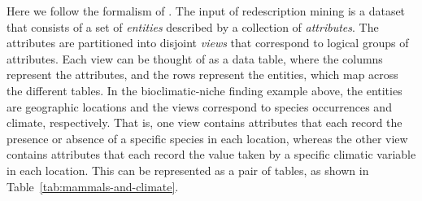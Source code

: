 \documentclass[12pt,a4paper]{article}
\begin{document}
Here we follow the formalism of \cite{Galbrun-Methods}.
The input of redescription mining is a dataset that consists of a set of \emph{entities} described by a collection of \emph{attributes}.
The attributes are partitioned into disjoint \emph{views} that correspond to logical groups of attributes. Each view can be thought of as a data table, where the columns represent the attributes, and the rows represent the entities, which map across the different tables.
In the bioclimatic-niche finding example above, the entities are geographic locations and the views correspond to species occurrences and climate, respectively.
That is, one view contains attributes that each record the presence or absence of a specific species in each location, whereas the other view contains attributes that each record the value taken by a specific climatic variable in each location.
This can be represented as a pair of tables, as shown in Table~\ref{tab:mammals-and-climate}.

\begin{table}[tb]
\caption{An example dataset, represented as a pair of data tables with mapped rows. The left-hand side table records occurrences of various species, while the right-hand side table records the values of various bio-climatic variables such as temperature (T, in \si{\degreeCelsius{}}) and precipitation (P, in \si{\milli\meter}).}
\label{tab:mammals-and-climate}
\end{table}
\end{document}
